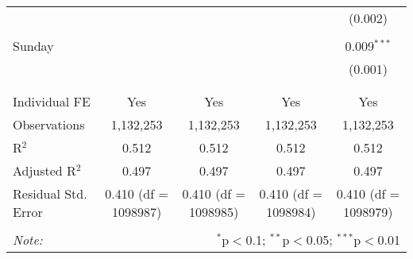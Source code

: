\documentclass[
]{article}
\begin{document}
\begin{table}[!htbp]
{\begin{tabular}{@{\extracolsep{5pt}}lcccc}
  &  &  &  & (0.002) \\ 
  & & & & \\ 
 Sunday &  &  &  & 0.009$^{***}$ \\ 
  &  &  &  & (0.001) \\ 
  & & & & \\ 
\hline \\[-1.8ex] 
Individual FE & Yes & Yes & Yes & Yes \\ 
Observations & 1,132,253 & 1,132,253 & 1,132,253 & 1,132,253 \\ 
R$^{2}$ & 0.512 & 0.512 & 0.512 & 0.512 \\ 
Adjusted R$^{2}$ & 0.497 & 0.497 & 0.497 & 0.497 \\ 
Residual Std. Error & 0.410 (df = 1098987) & 0.410 (df = 1098985) & 0.410 (df = 1098984) & 0.410 (df = 1098979) \\ 
\hline 
\hline \\[-1.8ex] 
\textit{Note:}  & \multicolumn{4}{r}{$^{*}$p$<$0.1; $^{**}$p$<$0.05; $^{***}$p$<$0.01} \\ 
\end{tabular}
} 
\end{table} 
\newpage
\end{document}
